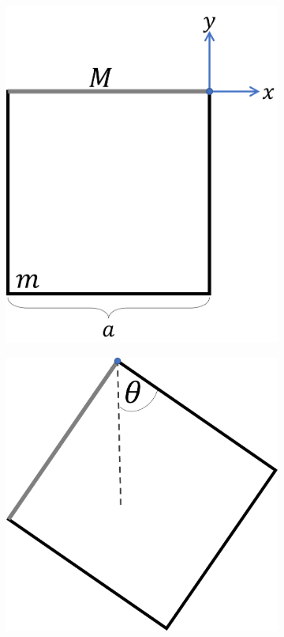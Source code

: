 \documentclass[letterpaper,11pt]{article}
\begin{document}
\begin{enumerate}
\begin{figure}[H]
    \centering
    \begin{subfigure}[t]{0.4\linewidth}
        \centering
        \includegraphics[width=0.8\linewidth]{2022-2/Imagenes/Capsula2/fierro_a.png}
        \caption{}
    \end{subfigure}
    \hspace{3em}
    \begin{subfigure}[t]{0.4\linewidth}
        \centering
        \includegraphics[width=0.8\linewidth]{2022-2/Imagenes/Capsula2/fierro_b.png}
        \caption{}
    \end{subfigure}
\end{figure}

\end{enumerate}
\end{document}

